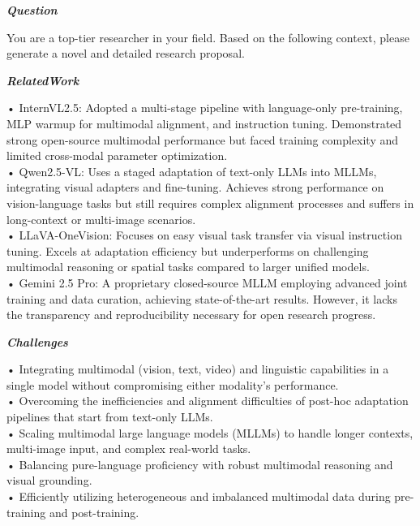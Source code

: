 \begin{tcolorbox}[
    breakable,
    title={Example of Idea Generation in Information},
    colback=LighterGray,
    colframe=DeepPurple,
    colbacktitle=DeepPurple,
    coltitle=White,
]
\textbf{\emph{\textcolor{DeepPurple}{Question}}}

You are a top-tier researcher in your field. Based on the following context, please generate a novel and detailed research proposal.

\textbf{\emph{\textcolor{CaseOrange}{RelatedWork}}}

• InternVL2.5: Adopted a multi-stage pipeline with language-only pre-training, MLP warmup for multimodal alignment, and instruction tuning. Demonstrated strong open-source multimodal performance but faced training complexity and limited cross-modal parameter optimization. \\
• Qwen2.5-VL: Uses a staged adaptation of text-only LLMs into MLLMs, integrating visual adapters and fine-tuning. Achieves strong performance on vision-language tasks but still requires complex alignment processes and suffers in long-context or multi-image scenarios. \\
• LLaVA-OneVision: Focuses on easy visual task transfer via visual instruction tuning. Excels at adaptation efficiency but underperforms on challenging multimodal reasoning or spatial tasks compared to larger unified models. \\
• Gemini 2.5 Pro: A proprietary closed-source MLLM employing advanced joint training and data curation, achieving state-of-the-art results. However, it lacks the transparency and reproducibility necessary for open research progress. 

\textbf{\emph{\textcolor{CaseOrange}{Challenges}}}

• Integrating multimodal (vision, text, video) and linguistic capabilities in a single model without compromising either modality's performance. \\
• Overcoming the inefficiencies and alignment difficulties of post-hoc adaptation pipelines that start from text-only LLMs. \\
• Scaling multimodal large language models (MLLMs) to handle longer contexts, multi-image input, and complex real-world tasks. \\
• Balancing pure-language proficiency with robust multimodal reasoning and visual grounding. \\
• Efficiently utilizing heterogeneous and imbalanced multimodal data during pre-training and post-training. 


\end{tcolorbox}
